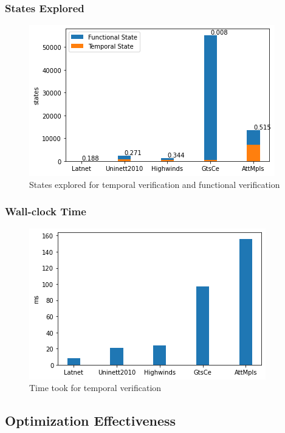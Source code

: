 \documentclass[10pt,sigconf,letterpaper,anonymous,nonacm]{acmart}
\begin{document}
\subsubsection{States Explored}
\begin{figure}[h]
    \centering
    \includegraphics[scale=0.5]{states}
    \caption{States explored for temporal verification and functional verification}
    \label{fig:states}
\end{figure}

\subsubsection{Wall-clock Time}
\begin{figure}[h]
    \centering
    \includegraphics[scale=0.5]{wallclock}
    \caption{Time took for temporal verification}
    \label{fig:wallclock}
\end{figure}

\subsection{Optimization Effectiveness}

\end{document}
